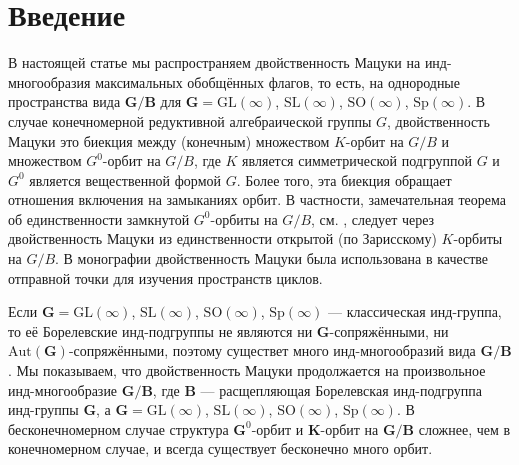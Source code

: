 \documentclass{amsart}
\theoremstyle{definition}
\begin{document}

\begin{footnotesize}

\end{footnotesize}
\maketitle


\section{Введение}

\label{S.intro}

В настоящей статье мы распространяем двойственность Мацуки на
инд-много\-образия максимальных обобщённых флагов, то есть, на однородные пространства вида $\mathbf{G}/\mathbf{B}$ для $\mathbf{G}=\mathrm{GL}(\infty)$, $\mathrm{SL}(\infty)$, $\mathrm{SO}(\infty)$, $\mathrm{Sp}(\infty)$.  В случае  конечномерной редуктивной алгебраической группы  $G$, двойственность Мацуки \cite{Gindikin-Matsuki, Matsuki, Matsuki3} это биекция между (конечным) множеством $K$-орбит на $G/B$ и множеством $G^0$-орбит на $G/B$, где $K$ является симметрической подгруппой $G$ и $G^0$ является вещественной формой $G$.  Более того, эта биекция обращает отношения включения на замыканиях орбит.  В частности, замечательная теорема об единственности замкнутой $G^0$-орбиты на $G/B$, см. \cite{W1}, следует  через двойственность  Мацуки из единственности  открытой (по Зарисскому) $K$-орбиты на $G/B$.
В монографии \cite{FHW} двойственность Мацуки была использована в качестве отправной точки для изучения  пространств циклов.

Если  $\mathbf{G}=\mathrm{GL}(\infty)$, $\mathrm{SL}(\infty)$, $\mathrm{SO}(\infty)$, $\mathrm{Sp}(\infty)$ --- классическая инд-группа, то её Борелевские инд-подгруппы не являются ни $\mathbf{G}$-сопряжёнными, ни $\mathrm{Aut}(\mathbf{G})$-сопряжёнными, поэтому существет много инд-многообразий вида $\mathbf{G}/\mathbf{B}$.  Мы показываем, что двойственность Мацуки продолжается на произвольное инд-много\-образие $\mathbf{G}/\mathbf{B}$, где $\mathbf{B}$ --- расщепляющая Борелевская инд-подгруппа  инд-группы $\mathbf{G}$, а $\mathbf{G}=\mathrm{GL}(\infty)$, $\mathrm{SL}(\infty)$, $\mathrm{SO}(\infty)$, $\mathrm{Sp}(\infty)$.  В бесконечномерном случае структура $\mathbf{G}^0$-орбит и $\mathbf{K}$-орбит на $\mathbf{G}/\mathbf{B}$ сложнее, чем в конечномерном случае, и  всегда существует бесконечно много орбит.
\end{document}
